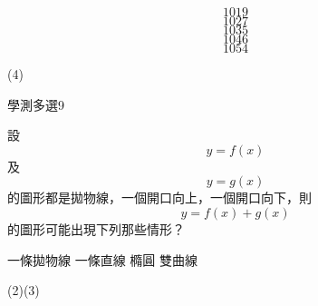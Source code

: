 \begin{QUESTIONS}
\begin{QUESTION}
\begin{QBODY}
            \begin{QOPS} 
 \QOP\[1019\]
            \QOP\[1027\]
            \QOP\[1035\]
            \QOP\[1046\]
            \QOP\[1054\] 
            \end{QOPS}          
        \end{QBODY}
        \begin{QFROMS}
        \end{QFROMS}
        \begin{QTAGS}\end{QTAGS}
        \begin{QANS}
            (4)
        \end{QANS}
        \begin{QSOLLIST}
        \end{QSOLLIST}
        \begin{QEMPTYSPACE}
        \end{QEMPTYSPACE}
    \end{QUESTION}
\end{QUESTIONS}\begin{QUESTIONS}
    \begin{QUESTION}
        \begin{ExamInfo}{85}{學測}{多選}{9}
        \end{ExamInfo}
        \begin{ExamAnsRateInfo}{}{}{}{}
        \end{ExamAnsRateInfo}
        \begin{QBODY}
            	設\[y=f\left( x \right)\]及\[y=g\left( x \right)\]的圖形都是拋物線，一個開口向上，一個開口向下，則\[y=f\left( x \right)+g\left( x \right)\]的圖形可能出現下列那些情形？
            \begin{QOPS} 
            \QOP 一條拋物線
            \QOP 一條直線
            \QOP 橢圓
            \QOP 雙曲線
            \end{QOPS}            
        \end{QBODY}
        \begin{QFROMS}
        \end{QFROMS}
        \begin{QTAGS}\end{QTAGS}
        \begin{QANS}
            (2)(3)
        \end{QANS}
        \begin{QSOLLIST}
        \end{QSOLLIST}
        \begin{QEMPTYSPACE}

\end{QEMPTYSPACE}
\end{QUESTION}
\end{QUESTIONS}
